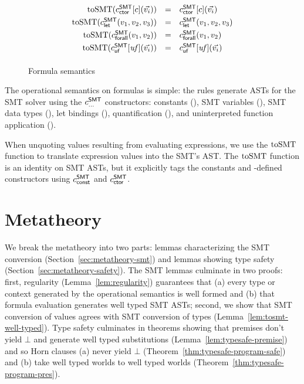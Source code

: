 \documentclass[acmsmall,screen,nonacm]{acmart}
\theoremstyle{definition}
\begin{document}
\begin{figure}[pt]
  \sidebyside[.45][.47][t]
  {\[ 
   \begin{array}{@{}rcl@{}}
     \tosmt(k) &=& \cCONST[k]() \\
     \tosmt(c(\vec{v_i})) &=& \cCTOR[c](\overrightarrow{\tosmt(v_i)}) \\
     \tosmt(\cCONST[k]()) &=& \cCONST[k]() \\[0.35em]
     \tosmt(\cVAR[x,t]()) &=& \cVAR[x,t]() \\[0.35em]
    \end{array} 
  \]}
  {\[
   \begin{array}{@{}rcl@{}}
     \tosmt(\cCTOR[c](\vec{v_i})) &=& \cCTOR[c](\vec{v_i}) \\[0.35em]
     \tosmt(\cLET(v_1, v_2, v_3)) &=& \cLET(v_1, v_2, v_3) \\[0.35em]
     \tosmt(\cFORALL(v_1, v_2)) &=& \cFORALL(v_1, v_2) \\[0.35em]
     \tosmt(\cUF[\uf](\vec{v_i})) &=& \cUF[\uf](\vec{v_i}) \\[0.35em]
   \end{array}
  \]}

  \caption{Formula semantics}
  \label{fig:opsem-formula}
\end{figure}

The operational semantics on formulas is simple: the rules generate
ASTs for the SMT solver using the $c^\mathsf{SMT}_{\mathsf{\dots}}$ constructors:
constants (\cCONST), SMT variables (\cVAR), SMT data types (\cCTOR),
let bindings (\cLET), quantification (\cFORALL), and uninterpreted
function application (\cUF).

When unquoting values resulting from evaluating expressions, we use
the $\mathrm{toSMT}$ function to translate expression values into the SMT's
AST.
%
The $\mathrm{toSMT}$ function is an identity on SMT ASTs, but it explicitly
tags the constants and \Name-defined constructors using $c^\mathsf{SMT}_{\mathsf{const}}$ and
$c^\mathsf{SMT}_{\mathsf{ctor}}$.

\section{Metatheory}
\label{sec:metatheory}

We break the metatheory into two parts: lemmas characterizing the SMT
conversion (Section~\ref{sec:metatheory-smt}) and lemmas showing type
safety (Section~\ref{sec:metatheory-safety}).
%
The SMT lemmas culminate in two proofs:
%
first, regularity (Lemma~\ref{lem:regularity}) guarantees that (a) every type
or context generated by the operational semantics is well formed and
(b) that formula evaluation generates well typed SMT ASTs;
%
second, we show that SMT conversion of values agrees with SMT
conversion of types (Lemma~\ref{lem:tosmt-well-typed}).
%
Type safety culminates in theorems showing that premises don't yield
$\bot$ and generate well typed substitutions
(Lemma~\ref{lem:typesafe-premise}) and so Horn clauses (a) never yield
$\bot$ (Theorem~\ref{thm:typesafe-program-safe}) and (b) take well
typed worlds to well typed worlds
(Theorem~\ref{thm:typesafe-program-pres}).
\end{document}
